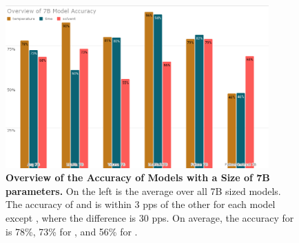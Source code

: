 \begin{figure}[!htbp]
    \begin{centering}
        \includegraphics[width=0.9\textwidth]{img/overview_7b_accuracy}
        \caption[Overview of 7B Models Accuracy]{\textbf{Overview of the Accuracy of Models with a Size of 7B parameters.}
        On the left is the average over all 7B sized models.
        The accuracy of \ttemp and \ttime is within 3 \glspl{pp} of the other for each model except , where the difference is 30 \glspl{pp}.
        On average, the accuracy for \ttemp is 78\%, 73\% for \ttime, and 56\% for \tsolv.
        }
        \label{fig:7b_acc}
    \end{centering}
\end{figure}

